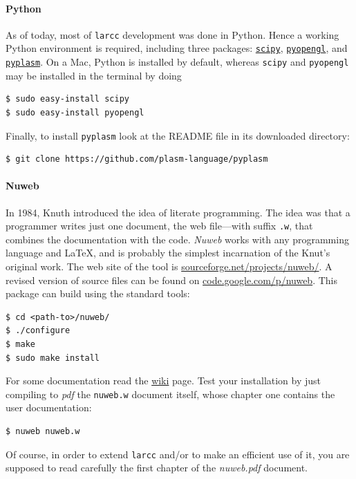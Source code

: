 \documentclass[11pt,oneside]{article}	%
\begin{document}
\paragraph{Python}
As of today, most of \texttt{larcc} development was done in Python. Hence a working Python environment is required, including three packages: \href{http://www.scipy.org}{\texttt{scipy}}, \href{http://pyopengl.sourceforge.net}{\texttt{pyopengl}}, and \href{https://github.com/plasm-language/pyplasm}{\texttt{pyplasm}}. On a Mac, Python is installed by default, whereas \texttt{scipy} and \texttt{pyopengl} may be installed in the terminal by doing 
\begin{verbatim}
$ sudo easy-install scipy
$ sudo easy-install pyopengl
\end{verbatim}
Finally, to install \texttt{pyplasm} look at the README file in its downloaded directory:
\begin{verbatim}
$ git clone https://github.com/plasm-language/pyplasm
\end{verbatim}

\paragraph{Nuweb}

In 1984, Knuth introduced the idea of literate programming. The idea was that a programmer writes just one document, the web file---with suffix \texttt{.w}, that combines the documentation with the code. \emph{Nuweb} works with any programming language and \LaTeX, and is probably the simplest incarnation of the Knut's original work.
The web site of the tool is \href{http://sourceforge.net/projects/nuweb/}{sourceforge.net/projects/nuweb/}.
A revised version of source files can be found on \href{https://code.google.com/p/nuweb/downloads/list}{code.google.com/p/nuweb}. This package can build using the standard tools:
\begin{verbatim}
$ cd <path-to>/nuweb/
$ ./configure
$ make
$ sudo make install
\end{verbatim}
For some documentation read the \href{https://code.google.com/p/nuweb/source/browse/branches/qse-nuweb/README?r=3}{wiki} page.  Test your installation by just compiling to \emph{pdf} the \texttt{nuweb.w} document itself, whose chapter one contains the user documentation:
\begin{verbatim}
$ nuweb nuweb.w
\end{verbatim}
Of course, in order to extend \texttt{larcc} and/or to make an efficient use of it, you are supposed to read carefully the first chapter of the \emph{nuweb.pdf} document.
\end{document}
